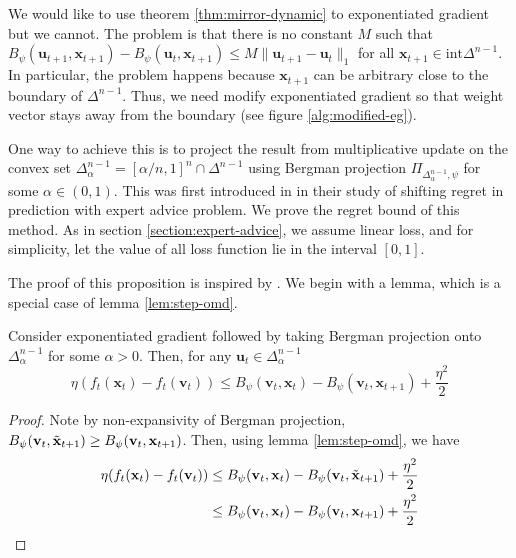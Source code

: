 \documentclass[12pt, a4paper]{report}
\begin{document}
We would like to use theorem \ref{thm:mirror-dynamic} to exponentiated gradient but we cannot. The problem is that there is no constant $M$ such that $B_\psi(\mathbf{u}_{t+1}, \mathbf{x}_{t+1}) - B_\psi(\mathbf{u}_t, \mathbf{x}_{t+1}) \leq M \lVert \mathbf{u}_{t+1} - \mathbf{u}_t \rVert_1$ for all $\mathbf{x}_{t+1} \in \mathrm{int} \Delta^{n-1}$. In particular, the problem happens because $\mathbf{x}_{t+1}$ can be arbitrary close to the boundary of $\Delta^{n-1}$. Thus, we need modify exponentiated gradient so that weight vector stays away from the boundary (see figure \ref{alg:modified-eg}).

One way to achieve this is to project the result from multiplicative update on the convex set $\Delta_\alpha^{n-1} = [\alpha/n, 1]^{n} \cap \Delta^{n-1}$ using Bergman projection $\Pi_{\Delta_\alpha^{n-1}, \psi}$ for some $\alpha \in (0, 1)$.  This was first introduced in \cite{Herbster2001Tracking} in their study of shifting regret in prediction with expert advice problem. We prove the regret bound of this method. As in section \ref{section:expert-advice}, we assume linear loss, and for simplicity, let the value of all loss function lie in the interval $[0, 1]$.

The proof of this proposition is inspired by \cite{CesaBianchi2012MirrorDM}. We begin with a lemma, which is a special case of lemma \ref{lem:step-omd}.
\begin{lem} \label{lem:exp-modified-step}
Consider exponentiated gradient followed by taking Bergman projection onto $\Delta_\alpha^{n-1}$ for some $\alpha > 0$. Then, for any $\mathbf{u}_t \in \Delta_\alpha^{n-1}$
\begin{equation*}
    \eta(f_t(\mathbf{x}_t) - f_t(\mathbf{v}_t)) \leq B_\psi(\mathbf{v}_t, \mathbf{x}_t) - B_\psi(\mathbf{v}_t, \mathbf{x}_{t+1}) + \frac{\eta^2}{2}
\end{equation*}
\end{lem}
\begin{proof}
Note by non-expansivity of Bergman projection, 
$B_\psi(\mathbf{v}_t, \Tilde{\mathbf{x}}_{t+1}) \geq B_\psi(\mathbf{v}_t, \mathbf{x}_{t+1})$. Then, using lemma \ref{lem:step-omd}, we have
\begin{align*}
    \eta(f_t(\mathbf{x}_t) - f_t(\mathbf{v}_t)) &\leq B_\psi(\mathbf{v}_t, \mathbf{x}_t) - B_\psi(\mathbf{v}_t, \Tilde{\mathbf{x}}_{t+1}) + \frac{\eta^2}{2}
    \\
    &\leq B_\psi(\mathbf{v}_t, \mathbf{x}_t) - B_\psi(\mathbf{v}_t, \mathbf{x}_{t+1}) + \frac{\eta^2}{2} \qedhere
\end{align*} 
\end{proof}
\end{document}
